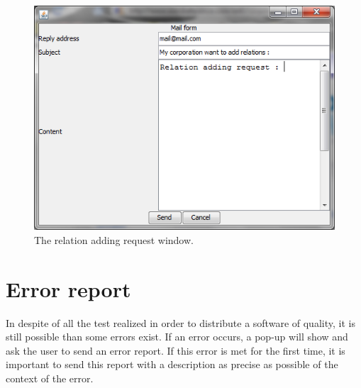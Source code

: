 \begin{figure}
\centering
\includegraphics[width=12cm]{images/mail_relation.png}
\caption{The relation adding request window.}
\end{figure}


\section{Error report}

In despite of all the test realized in order to distribute a software of quality, it is still possible than some errors exist. If an error occurs, a pop-up will show and ask the user to send an error report. If this error is met for the first time, it is important to send this report with a description as precise as possible of the context of the error.\\ 







